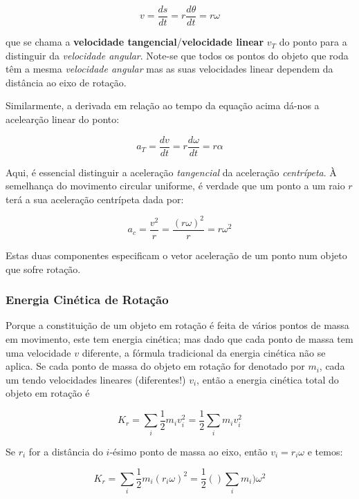 \begin{equation}
    v=\frac{ds}{dt}=r\frac{d\theta}{dt}=r\omega
\end{equation}

que se chama a \textbf{velocidade tangencial}/\textbf{velocidade linear} $v_T$ do ponto para a distinguir da \emph{velocidade angular}. Note-se que todos os pontos do objeto que roda têm a mesma \emph{velocidade angular} mas as suas velocidades linear dependem da distância ao eixo de rotação.

Similarmente, a derivada em relação ao tempo da equação acima dá-nos a acelearção linear do ponto:

\begin{equation}
    a_T=\frac{dv}{dt}=r\frac{d\omega}{dt}=r\alpha
\end{equation}

Aqui, é essencial distinguir a aceleração \emph{tangencial} da aceleração \emph{centrípeta}. À semelhança do movimento circular uniforme, é verdade que um ponto a um raio $r$ terá a sua aceleração centrípeta dada por:

\begin{equation}
    a_c=\frac{v^2}{r}=\frac{(r\omega)^2}{r}=r\omega^2
\end{equation}

Estas duas componentes especificam o vetor aceleração de um ponto num objeto que sofre rotação.

\subsubsection{Energia Cinética de Rotação}
Porque a constituição de um objeto em rotação é feita de vários pontos de massa em movimento, este tem energia cinética; mas dado que cada ponto de massa tem uma velocidade $v$ diferente, a fórmula tradicional da energia cinética não se aplica. Se cada ponto de massa do objeto em rotação for denotado por $m_i$, cada um tendo velocidades lineares (diferentes!) $v_i$, então a energia cinética total do objeto em rotação é

\begin{equation}
    K_{r}=\sum_{i}\frac{1}{2}m_iv_i^2=\frac{1}{2}\sum_i m_iv_i^2
\end{equation}

Se $r_i$ for a distância do $i$-ésimo ponto de massa ao eixo, então $v_i=r_i\omega$ e temos:

\begin{equation}
    K_{r}=\sum_{i}\frac{1}{2}m_i(r_i\omega)^2=\frac{1}{2}()\sum_i m_i)\omega^2
\end{equation}

